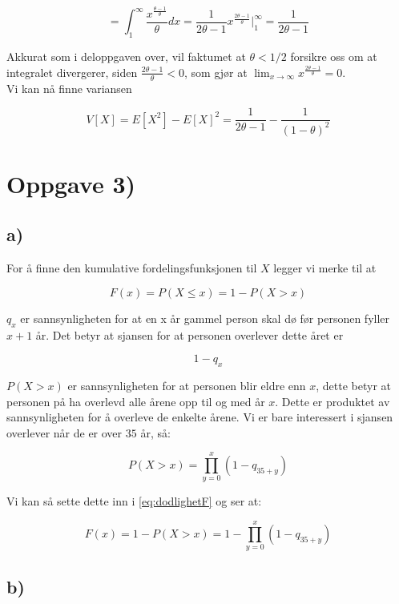 \documentclass[a4paper,norsk, 10pt]{article}
\begin{document}
$$
= \int_1^{\infty} \frac{x^{\frac{\theta -1}{\theta}}}{\theta} dx = \frac{1}{2\theta - 1}x^{\frac{2\theta - 1}{\theta}} \bigg\vert_1^{\infty} = \frac{1}{2\theta - 1}
$$

Akkurat som i deloppgaven over, vil faktumet at $\theta < 1/2$ forsikre oss om at integralet divergerer, siden $\frac{2\theta - 1 }{\theta} < 0$, som gjør at $\lim_{x \rightarrow \infty} x^{\frac{2\theta -1}{\theta}} = 0$.\\

Vi kan nå finne variansen

$$
V[X] = E[X^2] - E[X]^2 = \frac{1}{2\theta -1} - \frac{1}{(1-\theta) ^2}
$$ 


\section*{Oppgave 3)}
\subsection*{a)}

For å finne den kumulative fordelingsfunksjonen til $X$ legger vi merke til at 

\begin{equation}
F(x) = P( X\leq x) = 1 - P(X>x)
\label{eq:dodlighetF}
\end{equation}

$q_{x}$ er sannsynligheten for at en x år gammel person skal dø før personen fyller $x + 1$ år. Det betyr at sjansen for at personen overlever dette året er 

$$
1 - q_x
$$

$P(X>x)$ er sannsynligheten for at personen blir eldre enn $x$, dette betyr at personen på ha overlevd alle årene opp til og med år $x$. Dette er produktet av sannsynligheten for å overleve de enkelte årene. Vi er bare interessert i sjansen overlever når de er over $35$ år, så:

$$
P(X>x) = \prod_{y = 0}^x(1-q_{35+y})
$$

Vi kan så sette dette inn i \eqref{eq:dodlighetF} og ser at:

\begin{equation}
F(x) = 1 - P(X>x) = 1 - \prod_{y = 0}^x(1-q_{35+y})
\end{equation}

\subsection*{b)}
\end{document}
